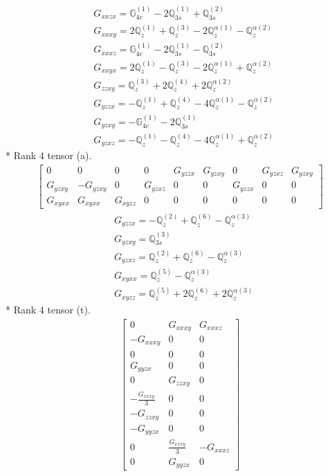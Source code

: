 \documentclass[fleqn,8pt,landscape]{jsarticle}
\begin{document}
\begin{align*}
& G_{xxzx} = \mathbb{G}_{4c}^{(1)} - 2 \mathbb{Q}_{3s}^{(1)} + \mathbb{Q}_{3s}^{(2)} \\
& G_{xxxy} = 2 \mathbb{Q}_{z}^{(1)} + \mathbb{Q}_{z}^{(3)} - 2 \mathbb{Q}_{z}^{\alpha(1)} - \mathbb{Q}_{z}^{\alpha(2)} \\
& G_{xxxz} = \mathbb{G}_{4c}^{(1)} - 2 \mathbb{Q}_{3s}^{(1)} - \mathbb{Q}_{3s}^{(2)} \\
& G_{xxyx} = 2 \mathbb{Q}_{z}^{(1)} - \mathbb{Q}_{z}^{(3)} - 2 \mathbb{Q}_{z}^{\alpha(1)} + \mathbb{Q}_{z}^{\alpha(2)} \\
& G_{zzxy} = \mathbb{Q}_{z}^{(3)} + 2 \mathbb{Q}_{z}^{(4)} + 2 \mathbb{Q}_{z}^{\alpha(2)} \\
& G_{yzzx} = - \mathbb{Q}_{z}^{(1)} + \mathbb{Q}_{z}^{(4)} - 4 \mathbb{Q}_{z}^{\alpha(1)} - \mathbb{Q}_{z}^{\alpha(2)} \\
& G_{yzxy} = - \mathbb{G}_{4c}^{(1)} - 2 \mathbb{Q}_{3s}^{(1)} \\
& G_{yzxz} = - \mathbb{Q}_{z}^{(1)} - \mathbb{Q}_{z}^{(4)} - 4 \mathbb{Q}_{z}^{\alpha(1)} + \mathbb{Q}_{z}^{\alpha(2)}
\end{align*}
* Rank 4 tensor (a).
\begin{align*}
\begin{bmatrix} 0 & 0 & 0 & 0 & G_{yzzx} & G_{yzxy} & 0 & G_{yzxz} & G_{yzxy} \\ G_{yzxy} & - G_{yzxy} & 0 & G_{yzxz} & 0 & 0 & G_{yzzx} & 0 & 0 \\ G_{xyxx} & G_{xyxx} & G_{xyzz} & 0 & 0 & 0 & 0 & 0 & 0 \end{bmatrix}
\end{align*}
\begin{align*}
& G_{yzzx} = - \mathbb{Q}_{z}^{(2)} + \mathbb{Q}_{z}^{(6)} - \mathbb{Q}_{z}^{\alpha(3)} \\
& G_{yzxy} = \mathbb{Q}_{3s}^{(3)} \\
& G_{yzxz} = \mathbb{Q}_{z}^{(2)} + \mathbb{Q}_{z}^{(6)} - \mathbb{Q}_{z}^{\alpha(3)} \\
& G_{xyxx} = \mathbb{Q}_{z}^{(5)} - \mathbb{Q}_{z}^{\alpha(3)} \\
& G_{xyzz} = \mathbb{Q}_{z}^{(5)} + 2 \mathbb{Q}_{z}^{(6)} + 2 \mathbb{Q}_{z}^{\alpha(3)}
\end{align*}
* Rank 4 tensor (t).
\begin{align*}
\begin{bmatrix} 0 & G_{xxxy} & G_{xxxz} \\ - G_{xxxy} & 0 & 0 \\ 0 & 0 & 0 \\ G_{yyzx} & 0 & 0 \\ 0 & G_{zzxy} & 0 \\ - \frac{G_{xxxy}}{3} & 0 & 0 \\ - G_{zzxy} & 0 & 0 \\ - G_{yyzx} & 0 & 0 \\ 0 & \frac{G_{xxxy}}{3} & - G_{xxxz} \\ 0 & G_{yyzx} & 0 \end{bmatrix}
\end{align*}
\end{document}
